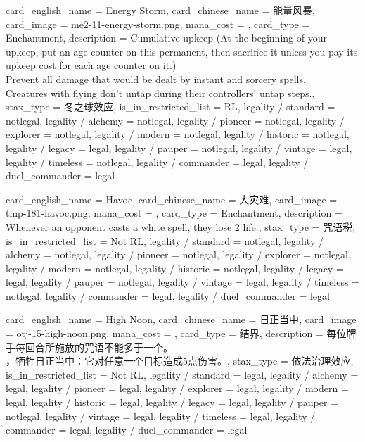 \documentclass[lang = cn, color = black, 10pt]{AllThatStax}
\begin{document}
\card
{
	card_english_name = {Energy Storm},
	card_chinese_name = {能量风暴},
	card_image = me2-11-energy-storm.png,
	mana_cost = ,
	card_type = Enchantment,
	description = {Cumulative upkeep  (At the beginning of your upkeep, put an age counter on this permanent, then sacrifice it unless you pay its upkeep cost for each age counter on it.)\\
		Prevent all damage that would be dealt by instant and sorcery spells.\\
		Creatures with flying don't untap during their controllers' untap steps.},
	stax_type = 冬之球效应,
	is_in_restricted_list = RL,
	legality / standard = notlegal,
	legality / alchemy = notlegal,
	legality / pioneer = notlegal,
	legality / explorer = notlegal,
	legality / modern = notlegal,
	legality / historic = notlegal,
	legality / legacy = legal,
	legality / pauper = notlegal,
	legality / vintage = legal,
	legality / timeless = notlegal,
	legality / commander = legal,
	legality / duel_commander = legal
}

\card
{
	card_english_name = {Havoc},
	card_chinese_name = {大灾难},
	card_image = tmp-181-havoc.png,
	mana_cost = ,
	card_type = Enchantment,
	description = {Whenever an opponent casts a white spell, they lose 2 life.},
	stax_type = 咒语税,
	is_in_restricted_list = Not RL,
	legality / standard = notlegal,
	legality / alchemy = notlegal,
	legality / pioneer = notlegal,
	legality / explorer = notlegal,
	legality / modern = notlegal,
	legality / historic = notlegal,
	legality / legacy = legal,
	legality / pauper = notlegal,
	legality / vintage = legal,
	legality / timeless = notlegal,
	legality / commander = legal,
	legality / duel_commander = legal
}

\card
{
	card_english_name = {High Noon},
	card_chinese_name = {日正当中},
	card_image = otj-15-high-noon.png,
	mana_cost = ,
	card_type = 结界,
	description = {每位牌手每回合所施放的咒语不能多于一个。\\
		，牺牲日正当中：它对任意一个目标造成5点伤害。},
	stax_type = 依法治理效应,
	is_in_restricted_list = Not RL,
	legality / standard = legal,
	legality / alchemy = legal,
	legality / pioneer = legal,
	legality / explorer = legal,
	legality / modern = legal,
	legality / historic = legal,
	legality / legacy = legal,
	legality / pauper = notlegal,
	legality / vintage = legal,
	legality / timeless = legal,
	legality / commander = legal,
	legality / duel_commander = legal
}
\end{document}
